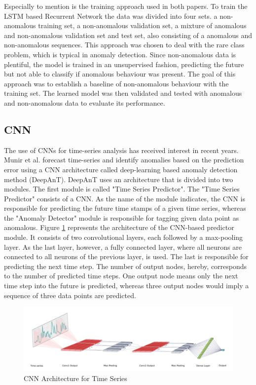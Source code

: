 Especially to mention is the training approach used in both papers. To train the  LSTM based Recurrent Network the data was divided into four sets. a non-anomalous training set, a non-anomalous validation set, a mixture of anomalous and non-anomalous validation set and test set, also consisting of a anomalous and non-anomalous sequences. This approach was chosen to deal with the rare class problem, which is typical in anomaly detection. Since non-anomalous data is plentiful, the model is trained in an unsupervised fashion, predicting the future but not able to classify if anomalous behaviour was present. The goal of this approach was to establish a baseline of non-anomalous behaviour with the training set. The learned model was then validated and tested with anomalous and non-anomalous data to evaluate its performance.



\subsection{CNN} \label{CNN on univariate series}

The use of CNNs for time-series analysis has received interest in recent years. Munir et al. \parencite*{Munir2019} forecast time-series and identify anomalies based on the prediction error using a CNN architecture called deep-learning based anomaly detection method (DeepAnT). DeepAnT uses an architecture that is divided into two modules. The first module is called "Time Series Predictor". The "Time Series Predictor" consists of a CNN. As the name of the module indicates, the CNN is responsible for predicting the future time stamps of a given time series, whereas  the "Anomaly Detector" module is responsible for tagging given data point as anomalous. Figure \ref{fig:CNN} represents the architecture of the CNN-based predictor module. It consists of two convolutional layers, each followed by a max-pooling layer. As the last layer, however, a fully connected layer, where all neurons are connected to all neurons of the previous layer, is used. The last is responsible for predicting the next time step. The number of output nodes, hereby, corresponds to the number of predicted time steps. One output node means only the next time step into the future is predicted, whereas three output nodes would imply a sequence of three data points are predicted.     


\begin{figure}[h]
	\centering
	\includegraphics[scale=0.4]{Figures/CNN}
	\decoRule
	\caption[CNN Architecture for Time Series]{CNN Architecture for Time Series \parencite{Munir2019}}
	\label{fig:CNN}
\end{figure}

